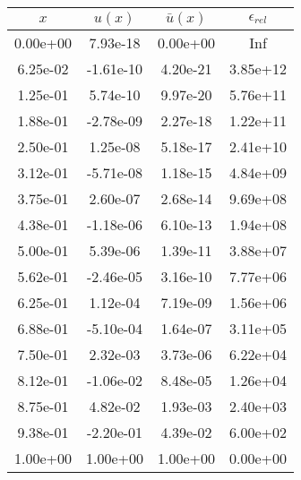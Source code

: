 \begin{tabular}{|c|c|c|c|}
\hline
\textbf{$x$}&\textbf{$u(x)$}&\textbf{$\bar{u}(x)$}&\textbf{$\epsilon_{rel}$}\\\hline
0.00e+00&7.93e-18&0.00e+00&Inf\\\hline
6.25e-02&-1.61e-10&4.20e-21&3.85e+12\\\hline
1.25e-01&5.74e-10&9.97e-20&5.76e+11\\\hline
1.88e-01&-2.78e-09&2.27e-18&1.22e+11\\\hline
2.50e-01&1.25e-08&5.18e-17&2.41e+10\\\hline
3.12e-01&-5.71e-08&1.18e-15&4.84e+09\\\hline
3.75e-01&2.60e-07&2.68e-14&9.69e+08\\\hline
4.38e-01&-1.18e-06&6.10e-13&1.94e+08\\\hline
5.00e-01&5.39e-06&1.39e-11&3.88e+07\\\hline
5.62e-01&-2.46e-05&3.16e-10&7.77e+06\\\hline
6.25e-01&1.12e-04&7.19e-09&1.56e+06\\\hline
6.88e-01&-5.10e-04&1.64e-07&3.11e+05\\\hline
7.50e-01&2.32e-03&3.73e-06&6.22e+04\\\hline
8.12e-01&-1.06e-02&8.48e-05&1.26e+04\\\hline
8.75e-01&4.82e-02&1.93e-03&2.40e+03\\\hline
9.38e-01&-2.20e-01&4.39e-02&6.00e+02\\\hline
1.00e+00&1.00e+00&1.00e+00&0.00e+00\\\hline
\end{tabular}

